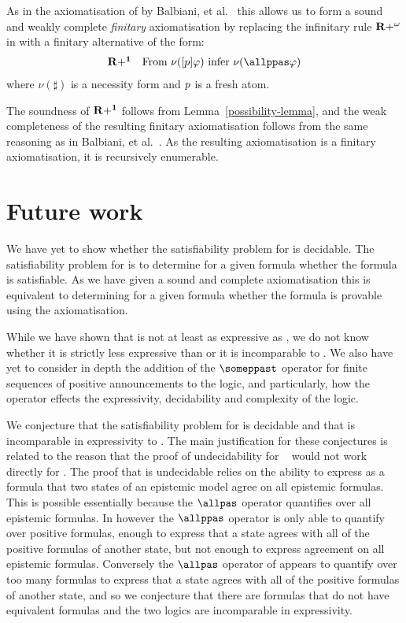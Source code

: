 As in the axiomatisation of \logicApalS{} by Balbiani, et al.~\cite{balbianietal:2008} this allows us to form a sound and weakly complete {\em finitary} axiomatisation by replacing the infinitary rule ${\bf R+^\omega}$ in \axiomPapalS{} with a finitary alternative of the form:
$$
\begin{array}{ll}
    {\bf R+^1} & \text{From } \nu(\announceA{\atomP} \phi) \text{ infer } \nu(\allppas \phi)
\end{array}
$$
where $\nu(\sharp)$ is a necessity form and $p$ is a fresh atom.  

The soundness of ${\bf R+^1}$ follows from Lemma~\ref{possibility-lemma}, and the weak completeness of the resulting finitary axiomatisation follows from the same reasoning as in Balbiani, et al.~\cite{balbianietal:2008}.
As the resulting axiomatisation is a finitary axiomatisation, it is recursively enumerable.

\section{Future work}\label{future-work}

We have yet to show whether the satisfiability problem for \logicPapalS{} is decidable.
The satisfiability problem for \logicPapalS{} is to determine for a given formula whether the formula is satisfiable.
As we have given a sound and complete axiomatisation this is equivalent to determining for a given formula whether the formula is provable using the axiomatisation.

While we have shown that \logicPapalS{} is not at least as expressive as \logicApalS{}, we do not know whether it is strictly less expressive than \logicApalS{} or it is incomparable to \logicApalS{}.
We also have yet to consider in depth the addition of the $\someppast$ operator for finite sequences of positive announcements to the logic, and particularly, how the operator effects the expressivity, decidability and complexity of the logic.

We conjecture that the satisfiability problem for \logicPapalS{} is decidable and that \logicPapalS{} is incomparable in expressivity to \logicApalS{}.
The main justification for these conjectures is related to the reason that the proof of undecidability for \logicApalS{}~\cite{frenchetal:2008} would not work directly for \logicPapalS{}.
The proof that \logicApalS{} is undecidable relies on the ability to express as a \langApal{} formula that two states of an epistemic model agree on all epistemic formulas.
This is possible essentially because the $\allpas$ operator quantifies over all epistemic formulas.
In \logicPapalS{} however the $\allppas$ operator is only able to quantify over positive formulas, enough to express that a state agrees with all of the positive formulas of another state, but not enough to express agreement on all epistemic formulas.
Conversely the $\allpas$ operator of \logicApalS{} appears to quantify over too many formulas to express that a state agrees with all of the positive formulas of another state, and so we conjecture that there are \langPapal{} formulas that do not have equivalent \langApal{} formulas and the two logics are incomparable in expressivity.

